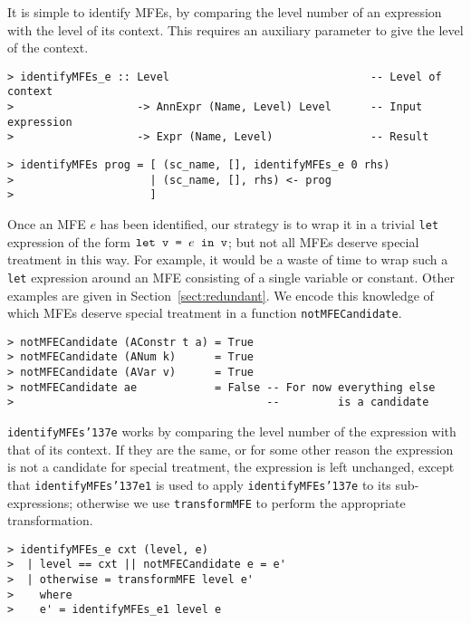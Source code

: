 It is simple to identify MFEs, by comparing the level number of an
expression with the level of its context.  This requires an auxiliary
parameter to give the level of the context.
\begin{verbatim}
> identifyMFEs_e :: Level                               -- Level of context
>                   -> AnnExpr (Name, Level) Level      -- Input expression
>                   -> Expr (Name, Level)               -- Result
\end{verbatim}
\begin{verbatim}
> identifyMFEs prog = [ (sc_name, [], identifyMFEs_e 0 rhs)
>                     | (sc_name, [], rhs) <- prog
>                     ]
\end{verbatim}
%
\par
Once an MFE $e$ has been identified, our strategy is to wrap it in a
trivial \mbox{\tt let} expression of the form $\mbox{\tt let\ v\ =\ }e\mbox{\tt \ in\ v}$; but not all
MFEs deserve special treatment in this way.  For example, it would be
a waste of time to wrap such a \mbox{\tt let} expression around an MFE consisting
of a single variable or constant.  Other examples are given in
Section~\ref{sect:redundant}.  We encode this knowledge of which MFEs
deserve special treatment in a function \mbox{\tt notMFECandidate}.
\begin{verbatim}
> notMFECandidate (AConstr t a) = True
> notMFECandidate (ANum k)      = True
> notMFECandidate (AVar v)      = True
> notMFECandidate ae            = False -- For now everything else
>                                       --         is a candidate
\end{verbatim}
%
%
%
%
\par
\mbox{\tt identifyMFEs{\char'137}e} works by comparing the level number of the expression
with that of its context.  If they are the same, or for some other
reason the expression is not a candidate for special treatment, the
expression is left unchanged, except that \mbox{\tt identifyMFEs{\char'137}e1} is used to
apply \mbox{\tt identifyMFEs{\char'137}e} to its sub-expressions; otherwise we use
\mbox{\tt transformMFE} to perform the appropriate transformation.
\begin{verbatim}
> identifyMFEs_e cxt (level, e)
>  | level == cxt || notMFECandidate e = e'
>  | otherwise = transformMFE level e'
>    where
>    e' = identifyMFEs_e1 level e
\end{verbatim}
